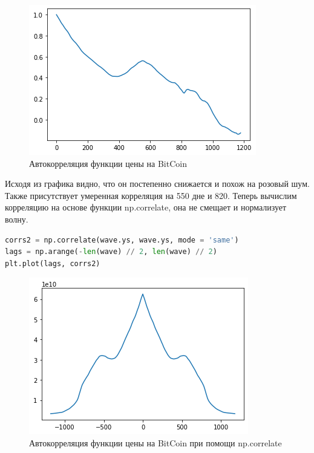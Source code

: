 \begin{figure}[H]
	\begin{center}
		\includegraphics[scale=1]{fig/lab05/lab05_07.png}
		\caption{Автокорреляция функции цены на BitCoin}
	\end{center}
\end{figure}

Исходя из графика видно, что он постепенно снижается и похож на розовый шум. Также присутствует умеренная корреляция на 550 дне и 820. Теперь вычислим корреляцию на основе функции np.correlate, она не смещает и нормализует волну.

\begin{lstlisting}[language=Python]
corrs2 = np.correlate(wave.ys, wave.ys, mode = 'same')
lags = np.arange(-len(wave) // 2, len(wave) // 2)
plt.plot(lags, corrs2)
\end{lstlisting}

\begin{figure}[H]
	\begin{center}
		\includegraphics[scale=1]{fig/lab05/lab05_08.png}
		\caption{Автокорреляция функции цены на BitCoin при помощи np.correlate}
	\end{center}
\end{figure}


